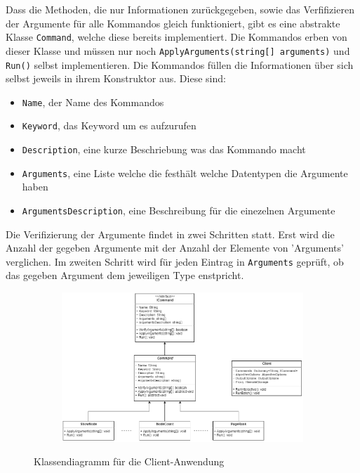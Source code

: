 Dass die Methoden, die nur Informationen zurückgegeben, sowie das Verfifizieren der Argumente für alle Kommandos gleich funktioniert, gibt es eine abstrakte Klasse
\verb|Command|, welche diese bereits implementiert. Die Kommandos erben von dieser Klasse und müssen nur noch \verb|ApplyArguments(string[] arguments)| und \verb|Run()| selbst implementieren.
Die Kommandos füllen die Informationen über sich selbst jeweils in ihrem Konstruktor aus. Diese sind:

\begin{itemize}
  \item \verb|Name|, der Name des Kommandos
  \item \verb|Keyword|, das Keyword um es aufzurufen
  \item \verb|Description|, eine kurze Beschriebung was das Kommando macht
  \item \verb|Arguments|, eine Liste welche die festhält welche Datentypen die Argumente haben
  \item \verb|ArgumentsDescription|, eine Beschreibung für die einezelnen Argumente
\end{itemize}

Die Verifizierung der Argumente findet in zwei Schritten statt. Erst wird die Anzahl der gegeben Argumente mit der Anzahl der Elemente von 'Arguments' verglichen.
Im zweiten Schritt wird für jeden Eintrag in \verb|Arguments| geprüft, ob das gegeben Argument dem jeweiligen Type enstpricht.


\begin{figure}
  \centering
  \begin{subfigure}[b]{1.0\textwidth}
    \includegraphics[width=1.0\linewidth]{img/client_class.png}
  \end{subfigure}
  \caption{Klassendiagramm für die Client-Anwendung}
  \label{clientClass}
\end{figure}


